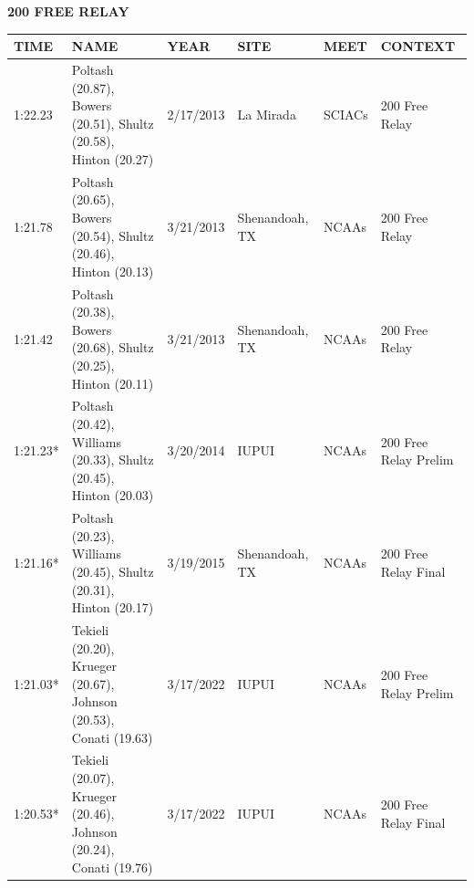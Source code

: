 \begin{table}[H]
\centering
\begin{minipage}[t]{0.6\textwidth}
\centering
\textbf{200 FREE RELAY}\\[0.1cm]
\begin{tabular}{@{}p{1.8cm}p{2.8cm}p{1.2cm}p{1.4cm}p{1.4cm}p{2.0cm}@{}}
\hline
    \textbf{TIME} & \textbf{NAME} & \textbf{YEAR} & \textbf{SITE} & \textbf{MEET} & \textbf{CONTEXT} \\
\hline
    1:22.23 & Poltash (20.87), Bowers (20.51), Shultz (20.58), Hinton (20.27) & 2/17/2013 & La Mirada & SCIACs & 200 Free Relay \\
    1:21.78 & Poltash (20.65), Bowers (20.54), Shultz (20.46), Hinton (20.13) & 3/21/2013 & Shenandoah, TX & NCAAs & 200 Free Relay \\
    1:21.42 & Poltash (20.38), Bowers (20.68), Shultz (20.25), Hinton (20.11) & 3/21/2013 & Shenandoah, TX & NCAAs & 200 Free Relay \\
    1:21.23* & Poltash (20.42), Williams (20.33), Shultz (20.45), Hinton (20.03) & 3/20/2014 & IUPUI & NCAAs & 200 Free Relay Prelim \\
    1:21.16* & Poltash (20.23), Williams (20.45), Shultz (20.31), Hinton (20.17) & 3/19/2015 & Shenandoah, TX & NCAAs & 200 Free Relay Final \\
    1:21.03* & Tekieli (20.20), Krueger (20.67), Johnson (20.53), Conati (19.63) & 3/17/2022 & IUPUI & NCAAs & 200 Free Relay Prelim \\
    1:20.53* & Tekieli (20.07), Krueger (20.46), Johnson (20.24), Conati (19.76) & 3/17/2022 & IUPUI & NCAAs & 200 Free Relay Final \\
\hline
\end{tabular}
\end{minipage}
\end{table}

